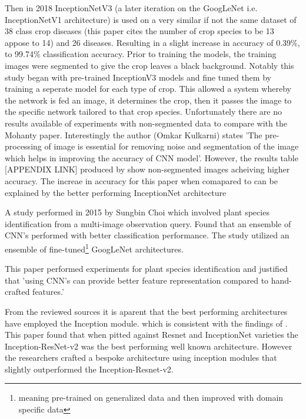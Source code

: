   \par
  Then in 2018 InceptionNetV3 (a later iteration on the GoogLeNet i.e. InceptionNetV1 architecture) is used on a very similar if not the same dataset of 38 class crop diseases (this paper cites the number of crop species to be 13 appose to 14) and 26 diseases. Resulting in a slight increase in accuracy of 0.39\%, to 99.74\% classification accuracy. \cite{Kulkarni2018} %
  Prior to training the models, the training images were segmented to give the crop leaves a black background.
  Notably this study began with pre-trained InceptionV3 models and fine tuned them by training a seperate model for each type of crop. This allowed a system whereby the network is fed an image, it determines the crop, then it passes the image to the specific network tailored to that crop species.
  Unfortunately there are no results available of experiments with non-segmented data to compare with the Mohanty paper. Interestingly the author (Omkar Kulkarni) states 'The pre-processing of image is essential for removing noise and segmentation of the image which helps in improving the accuracy of CNN model'. However, the results table [APPENDIX LINK] produced by \cite{Mohanty2016} show non-segmented images acheiving higher accuracy. The increae in accuracy for this paper when comapared to \cite{Mohanty2016} can be explained by the better performing InceptionNet architecture %
  \par
  A study performed in 2015 by Sungbin Choi \cite{Choi} which involved plant species identification from a multi-image observation query. Found that an ensemble of CNN's performed with better classification performance. The study utilized an ensemble of fine-tuned\footnote[2]{meaning pre-trained on generalized data and then improved with domain specific data} GoogLeNet architectures.
  \par
  This paper \cite{Zhu2018} performed experiments for plant species identification and justified that 'using CNN's can provide better feature representation compared to hand-crafted features.' %
  \par
  From the reviewed sources it is aparent that the best performing architectures have employed the Inception \cite{Szegedy2015} module.
  which is consistent with the findings of \cite{Wu2019}. This paper found that when pitted against Resnet %
   \cite{He} and InceptionNet varieties the Inception-ResNet-v2 was the best performing well known architecture. However the researchers crafted a bespoke architecture using inception modules that slightly outperformed the Inception-Resnet-v2. %
